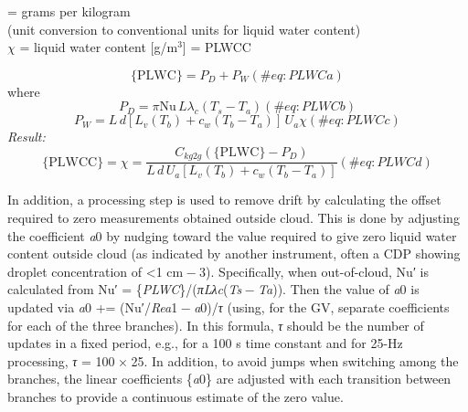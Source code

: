 \documentclass[
  english,
]{book}
\begin{document}
= grams per kilogram\\
\hspace*{0.333em}\hspace*{0.333em}\hspace*{0.333em}\hspace*{0.333em}\hspace*{0.333em}\hspace*{0.333em}\hspace*{0.333em}\hspace*{0.333em}\hspace*{0.333em}\hspace*{0.333em}(unit
conversion to conventional units for liquid water content)\\
\(\chi\) = liquid water
content {[}g/m\(^{3}\){]} = PLWCC

\begin{equation}
\mathrm{\{PLWC\}} = P_{D}+P_{W}
(\#eq:PLWCa)
\end{equation} where\\
\begin{equation}
P_{D}=\pi\mathrm{Nu}\,L\lambda_{c}(T_{s}-T_{a})
(\#eq:PLWCb)
\end{equation} \begin{equation}
P_{W}=L\,d[L_{v}(T_{b})+c_{w}(T_{b}-T_{a})]\,U_{a}\chi
(\#eq:PLWCc)
\end{equation} \emph{Result:}\\
\begin{equation}
\mathrm{\{PLWCC\}}=\chi=\frac{C_{kg2g}(\mathrm{\{PLWC\}}-P_{D})}{L\,d\,U_{a}[L_{v}(T_{b})+c_{w}(T_{b}-T_{a})]}
(\#eq:PLWCd)
\end{equation}

In addition, a processing step is used to remove drift by calculating
the offset required to zero measurements obtained outside cloud. This is
done by adjusting the coefficient {\emph{a}0} by nudging toward the
value required to give zero liquid water content outside cloud (as
indicated by another instrument, often a CDP showing droplet
concentration of \textless1 cm{ − 3}). Specifically, when out-of-cloud,
Nu{′} is calculated from
Nu{′ = \{\emph{PLWC}\}/(\emph{πLλ}\emph{c}(\emph{T}\emph{s} − \emph{T}\emph{a}))}.
Then the value of {\emph{a}0} is updated via {\emph{a}0} +=
(Nu{′/\emph{Re}\emph{a}1 − \emph{a}0)/\emph{τ}} (using, for the GV,
separate coefficients for each of the three branches). In this formula,
{\emph{τ}} should be the number of updates in a fixed period, e.g., for
a 100 s time constant and for 25-Hz processing, {\emph{τ} = 100 × 25}.
In addition, to avoid jumps when switching among the branches, the
linear coefficients \{{\emph{a}0}\} are adjusted with each transition
between branches to provide a continuous estimate of the zero value.
\end{document}
